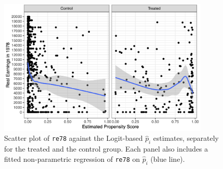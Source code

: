 \documentclass[
]{article}
\begin{document}
\newpage
\begin{figure}[!htb]
\centering
  \includegraphics[width=0.9\textwidth]{figures/figures_end.png}
  \caption{Scatter plot of \texttt{re78} against the Logit-based $\widehat{p}_{i}$ estimates, separately for the treated and the control group. Each panel also includes a fitted non-parametric regression of \texttt{re78} on $\widehat{p}_{i}$ (blue line).}
  \label{fig:propensity_vs_earnings}
\end{figure}
\end{document}
